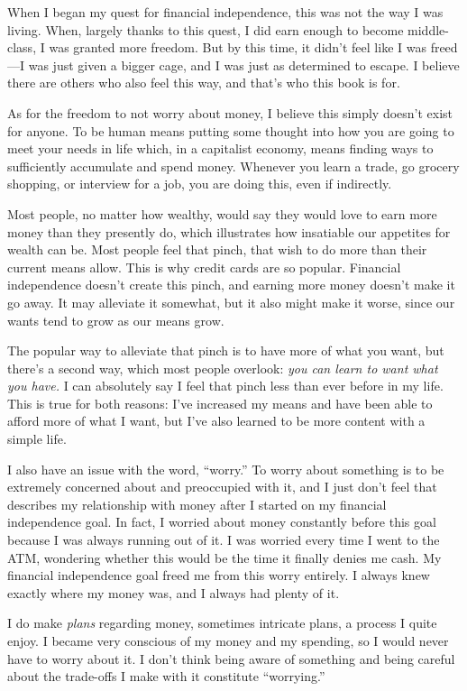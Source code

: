 When I began my quest for financial independence, this was not the way I was living. When, largely thanks to this quest, I did earn enough to become middle-class, I was granted more freedom. But by this time, it didn't feel like I was freed---I was just given a bigger cage, and I was just as determined to escape. I believe there are others who also feel this way, and that's who this book is for.

As for the freedom to not worry about money, I believe this simply doesn't exist for anyone. To be human means putting some thought into how you are going to meet your needs in life which, in a capitalist economy, means finding ways to sufficiently accumulate and spend money. Whenever you learn a trade, go grocery shopping, or interview for a job, you are doing this, even if indirectly.

Most people, no matter how wealthy, would say they would love to earn more money than they presently do, which illustrates how insatiable our appetites for wealth can be. Most people feel that pinch, that wish to do more than their current means allow. This is why credit cards are so popular. Financial independence doesn't create this pinch, and earning more money doesn't make it go away. It may alleviate it somewhat, but it also might make it worse, since our wants tend to grow as our means grow.

The popular way to alleviate that pinch is to have more of what you want, but there's a second way, which most people overlook: \emph{you can learn to want what you have.} I can absolutely say I feel that pinch less than ever before in my life. This is true for both reasons: I've increased my means and have been able to afford more of what I want, but I've also learned to be more content with a simple life.

I also have an issue with the word, ``worry.'' To worry about something is to be extremely concerned about and preoccupied with it, and I just don't feel that describes my relationship with money after I started on my financial independence goal. In fact, I worried about money constantly before this goal because I was always running out of it. I was worried every time I went to the ATM, wondering whether this would be the time it finally denies me cash. My financial independence goal freed me from this worry entirely. I always knew exactly where my money was, and I always had plenty of it.

I do make \emph{plans} regarding money, sometimes intricate plans, a process I quite enjoy. I became very conscious of my money and my spending, so I would never have to worry about it. I don't think being aware of something and being careful about the trade-offs I make with it constitute ``worrying.''

